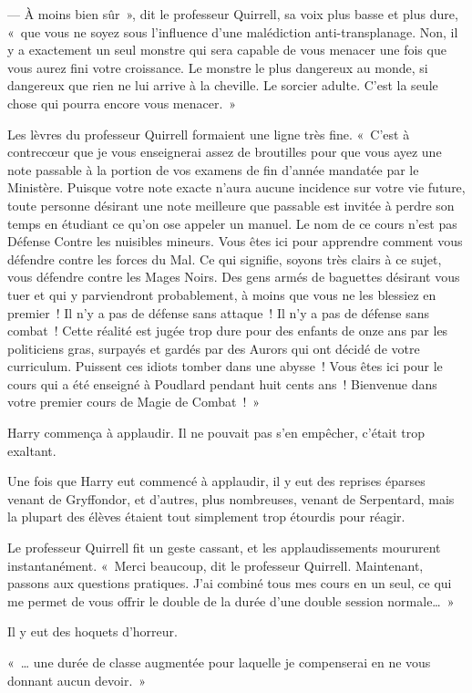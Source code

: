 --- À moins bien sûr~», dit le professeur Quirrell, sa voix plus basse et plus dure, «~que vous ne soyez sous l'influence d'une malédiction anti-transplanage. Non, il y a exactement un seul monstre qui sera capable de vous menacer une fois que vous aurez fini votre croissance. Le monstre le plus dangereux au monde, si dangereux que rien ne lui arrive à la cheville. Le sorcier adulte. C'est la seule chose qui pourra encore vous menacer.~»

Les lèvres du professeur Quirrell formaient une ligne très fine. «~C'est à contrecœur que je vous enseignerai assez de broutilles pour que vous ayez une note passable à la portion de vos examens de fin d'année mandatée par le Ministère. Puisque votre note exacte n'aura aucune incidence sur votre vie future, toute personne désirant une note meilleure que passable est invitée à perdre son temps en étudiant ce qu'on ose appeler un manuel. Le nom de ce cours n'est pas Défense Contre les nuisibles mineurs. Vous êtes ici pour apprendre comment vous défendre contre les forces du Mal. Ce qui signifie, soyons très clairs à ce sujet, vous défendre contre les Mages Noirs. Des gens armés de baguettes désirant vous tuer et qui y parviendront probablement, à moins que vous ne les blessiez en premier~! Il n'y a pas de défense sans attaque~! Il n'y a pas de défense sans combat~! Cette réalité est jugée trop dure pour des enfants de onze ans par les politiciens gras, surpayés et gardés par des Aurors qui ont décidé de votre curriculum. Puissent ces idiots tomber dans une abysse~! Vous êtes ici pour le cours qui a été enseigné à Poudlard pendant huit cents ans~! Bienvenue dans votre premier cours de Magie de Combat~!~»

Harry commença à applaudir. Il ne pouvait pas s'en empêcher, c'était trop exaltant.

Une fois que Harry eut commencé à applaudir, il y eut des reprises éparses venant de Gryffondor, et d'autres, plus nombreuses, venant de Serpentard, mais la plupart des élèves étaient tout simplement trop étourdis pour réagir.

Le professeur Quirrell fit un geste cassant, et les applaudissements moururent instantanément. «~Merci beaucoup, dit le professeur Quirrell. Maintenant, passons aux questions pratiques. J'ai combiné tous mes cours en un seul, ce qui me permet de vous offrir le double de la durée d'une double session normale…~»

Il y eut des hoquets d'horreur.

«~… une durée de classe augmentée pour laquelle je compenserai en ne vous donnant aucun devoir.~»

